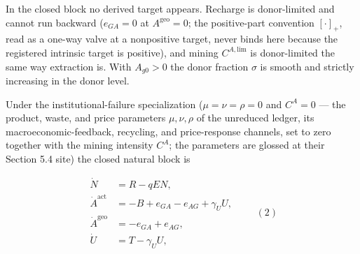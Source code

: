 \documentclass[11pt]{article}
\begin{document}
In the closed block no derived target appears. Recharge is donor-limited and cannot run backward (\(e_{GA} = 0\) at \(A^{\mathrm{geo}} = 0\); the positive-part convention \([\cdot]_+\), read as a one-way valve at a nonpositive target, never binds here because the registered intrinsic target is positive), and mining \(C^{A,\mathrm{lim}}\) is donor-limited the same way extraction is. With \(A_{g0} > 0\) the donor fraction \(\sigma\) is smooth and strictly increasing in the donor level.

Under the institutional-failure specialization (\(\mu = \nu = \rho = 0\) and \(C^A = 0\) --- the product, waste, and price parameters \(\mu, \nu, \rho\) of the unreduced ledger, its macroeconomic-feedback, recycling, and price-response channels, set to zero together with the mining intensity \(C^A\); the parameters are glossed at their Section 5.4 site) the closed natural block is 

$$\begin{aligned} \dot N &= R - qEN, \\ \dot A^{\mathrm{act}} &= -B + e_{GA} - e_{AG} + \gamma_U U, \\ \dot A^{\mathrm{geo}} &= -e_{GA} + e_{AG}, \\ \dot U &= T - \gamma_U U, \end{aligned} \qquad (2)$$
\end{document}
